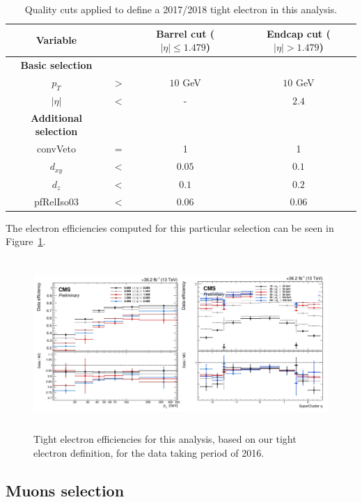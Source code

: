 \documentclass[a4paper, 10pt, openright]{report}
\begin{document}
\begin{table}
\begin{center}
\begin{tabular}{ c|c|c|c } 
 \hline
 Variable & & Barrel cut ($|\eta| \leq 1.479$) & Endcap cut ($|\eta| > 1.479$) \\
\hline
\textbf{Basic selection} & &  \\ 
$p_T$ & $>$ & $10$ GeV & $10$ GeV \\
 $|\eta|$ & $<$ & - & $2.4$ \\
 \hline
 	\textbf{Additional selection} & &  \\ 
 convVeto & $=$ & 1 & 1 \\
 $d_{xy}$ & $<$ &  $0.05$ & $0.1$ \\
 $d_z$ & $<$ & $0.1$ & $0.2$ \\
 pfRelIso03 & $<$ & $0.06$ & $0.06$ \\
\hline
\end{tabular}
\caption{Quality cuts applied to define a 2017/2018 tight electron in this analysis.}
\label{table:EleWP20178}
\end{center}
\end{table}	

The electron efficiencies computed for this particular selection can be seen in Figure~\ref{fig:EleEff}.

\begin{figure}[htbp]
\centering
\includegraphics[width=14cm, height=6.5cm]{figs/EleEff.png}
\caption{Tight electron efficiencies for this analysis, based on our tight electron definition, for the data taking period of 2016.}
\label{fig:EleEff}
\end{figure}

\subsection{Muons selection} \label{section:MuSel}
\end{document}
